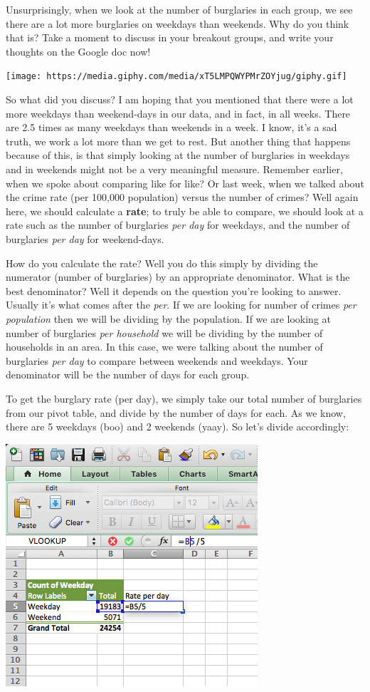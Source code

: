 \documentclass[
]{book}
\begin{document}
Unsurprisingly, when we look at the number of burglaries in each group, we see there are a lot more burglaries on weekdays than weekends. Why do you think that is? Take a moment to discuss in your breakout groups, and write your thoughts on the Google doc now!

\texttt{[image: https://media.giphy.com/media/xT5LMPQWYPMrZOYjug/giphy.gif]}

So what did you discuss? I am hoping that you mentioned that there were a lot more weekdays than weekend-days in our data, and in fact, in all weeks. There are 2.5 times as many weekdays than weekends in a week. I know, it's a sad truth, we work a lot more than we get to rest. But another thing that happens because of this, is that simply looking at the number of burglaries in weekdays and in weekends might not be a very meaningful measure. Remember earlier, when we spoke about comparing like for like? Or last week, when we talked about the crime rate (per 100,000 population) versus the number of crimes? Well again here, we should calculate a \textbf{rate}; to truly be able to compare, we should look at a rate such as the number of burglaries \emph{per day} for weekdays, and the number of burglaries \emph{per day} for weekend-days.

How do you calculate the rate? Well you do this simply by dividing the numerator (number of burglaries) by an appropriate denominator. What is the best denominator? Well it depends on the question you're looking to answer. Usually it's what comes after the \emph{per}. If we are looking for number of crimes \emph{per population} then we will be dividing by the population. If we are looking at number of burglaries \emph{per household} we will be dividing by the number of households in an area. In this case, we were talking about the number of burglaries \emph{per day} to compare between weekends and weekdays. Your denominator will be the number of days for each group.

To get the burglary rate (per day), we simply take our total number of burglaries from our pivot table, and divide by the number of days for each. As we know, there are 5 weekdays (boo) and 2 weekends (yaay). So let's divide accordingly:

\includegraphics{imgs/burg_1.png}
\end{document}
